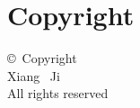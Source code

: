 \ifwww
\chapter*{Copyright} 
\else
\newpage
\thispagestyle{empty}
\vspace*{\fill}
\fi

\begin{center}
\copyright\ Copyright 
\Month \Year \\
Xiang \ Ji\\
All rights reserved\\
\end{center}

\ifwww\else
\vspace*{\fill}
\fi
